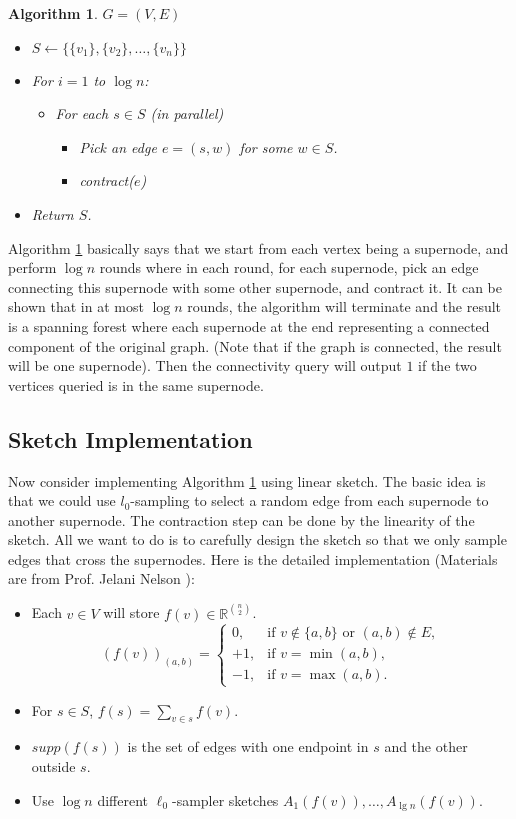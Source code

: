 \documentclass[11pt]{article}
\theoremstyle{plain}
\newtheorem{algorithm}{Algorithm}[section]
\begin{document}
\begin{algorithm}
\label{al:spanningforest-nonstreaming}
$G=(V,E)$
\begin{itemize}
	\item $S\leftarrow\{\{v_1\},\{v_2\},\ldots,\{v_n\}\}$
	\item For $i=1$ to $\log n$:
	\begin{itemize}
		\item For each $s\in S$ (in parallel)
		\begin{itemize}
			\item Pick an edge $e=(s,w)$ for some $w\in S$.
			\item contract($e$)
		\end{itemize}
	\end{itemize}
	\item Return $S$.
\end{itemize}
\end{algorithm}

Algorithm \ref{al:spanningforest-nonstreaming} basically says that we start from 
each vertex being a supernode, and perform $\log n$ rounds where in each 
round, for each supernode, pick an edge connecting this supernode with some 
other supernode, and contract it. It can be shown that in at most $\log n $ 
rounds, the algorithm will terminate and the result is a spanning forest where 
each supernode at the end representing a connected component of the original 
graph. (Note that if the graph is connected, the result will be one supernode). 
Then the connectivity query will output $1$ if the two vertices queried is in the 
same supernode. 

\subsection{Sketch Implementation}
Now consider implementing Algorithm \ref{al:spanningforest-nonstreaming} 
using linear sketch. The basic idea is that we could use $l_0$-sampling to select 
a random edge from each supernode to another supernode. The contraction 
step can be done by the linearity of the sketch. All we want to do is to carefully 
design the sketch so that we only sample edges that cross the supernodes. 
Here is the detailed implementation (Materials are from 
Prof. Jelani Nelson  \cite{Nel2015-web}):

\begin{itemize}
	\item Each $v\in V$ will store $f(v)\in\mathbb{R}^{\binom{n}{2}}$.
	\[
	(f(v))_{(a,b)}=
	\begin{cases}
	0, & \text{if }v\notin\{a,b\}\text{ or }(a,b)\notin E, \\
	+1, & \text{if }v=\min(a,b), \\
	-1, & \text{if }v=\max(a,b).
	\end{cases}
	\]
	\item For $s\in S$, $f(s)=\sum\limits_{v\in s} f(v)$.
	\item $supp(f(s))$ is the set of edges with one endpoint in $s$ and the other 
	outside $s$.
	\item Use $\log n$ different $\ell_0$-sampler sketches $A_1(f(v)),\ldots,A_{\lg 
	n}(f(v))$.
\end{itemize}
\end{document}
